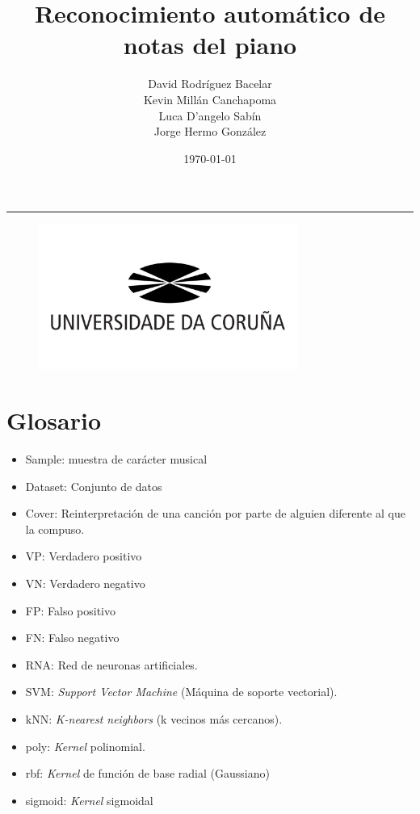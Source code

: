 \documentclass[12pt]{article}
\title{\textbf{\huge Reconocimiento automático de notas del piano}}
\author{{David Rodríguez Bacelar} \\[0.25cm] {Kevin Millán Canchapoma} \\[0.25cm]{Luca D'angelo Sabín} \\[0.25cm]{Jorge Hermo González}}
\date{\today}
\newcommand{\HRule}{\rule{\linewidth}{0.5mm}}
\begin{document}
\maketitle
\HRule
\bigskip\bigskip\bigskip\bigskip\bigskip\bigskip
\begin{figure}[!ht]
	\centering
	\includegraphics[height=180px]{assets/udc.jpg}
	\label{fig:diagram1}
\end{figure}

\newpage

\tableofcontents

\newpage
\section{Glosario}
\label{Glosario}
\begin{itemize}
	\item Sample: muestra de carácter musical
 	\item Dataset: Conjunto de datos
	\item Cover: Reinterpretación de una canción por parte de alguien diferente al que la compuso.
	\item VP: Verdadero positivo
	\item VN: Verdadero negativo
	\item FP: Falso positivo
	\item FN: Falso negativo
	\item RNA: Red de neuronas artificiales.
	\item SVM: \textit{Support Vector Machine} (Máquina de soporte vectorial).
	\item kNN: \textit{K-nearest neighbors} (k vecinos más cercanos).
	\item poly: \textit{Kernel} polinomial.
	\item rbf: \textit{Kernel} de función de base radial (Gaussiano)
	\item sigmoid: \textit{Kernel} sigmoidal
\end{itemize}
\end{document}
